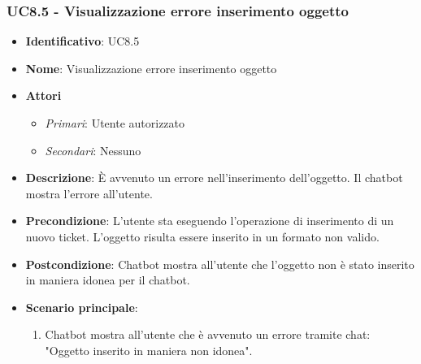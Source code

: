\subsubsection{UC8.5 - Visualizzazione errore inserimento oggetto}
\begin{itemize}
	\item \textbf{Identificativo}: UC8.5
	\item \textbf{Nome}: Visualizzazione errore inserimento oggetto 
	\item \textbf{Attori}
	\begin{itemize} 
		\item \textit{Primari}: Utente autorizzato
		\item \textit{Secondari}: Nessuno
	\end{itemize}
	\item \textbf{Descrizione}: È avvenuto un errore nell'inserimento dell'oggetto. Il chatbot mostra l'errore all'utente.
	\item \textbf{Precondizione}: L'utente sta eseguendo l'operazione di inserimento di un nuovo ticket. L'oggetto risulta essere inserito in un formato non valido. 
	\item \textbf{Postcondizione}: Chatbot mostra all'utente che l'oggetto non è stato inserito in maniera idonea per il chatbot.
	\item \textbf{Scenario principale}: \begin{enumerate}
		\item Chatbot mostra all'utente che è avvenuto un errore tramite chat: "Oggetto inserito in maniera non idonea".
		\end{enumerate}
\end{itemize}
